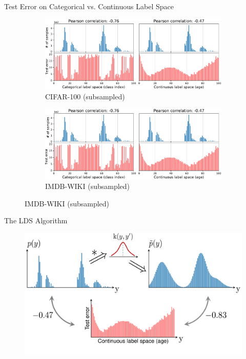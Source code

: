 \begin{frame}{Test Error on Categorical vs. Continuous Label Space}
	\begin{figure}[h]
		\begin{subfigure}{0.48\textwidth}
			\includegraphics[width=\linewidth]{images/err_motivate_1_left.pdf}
			\caption{CIFAR-100 (subsampled)}
		\end{subfigure}\hspace{1em}%
		\begin{subfigure}{0.48\textwidth}
			\includegraphics[width=\linewidth]{images/err_motivate_1_right.pdf}
			\caption{IMDB-WIKI (subsampled)}
		\end{subfigure}
	\end{figure}
\end{frame}
\begin{frame}{The LDS Algorithm}
	\begin{figure}[h]
		\includegraphics[width=\linewidth]{images/err_motivate_sep.pdf}
	\end{figure}
\end{frame}